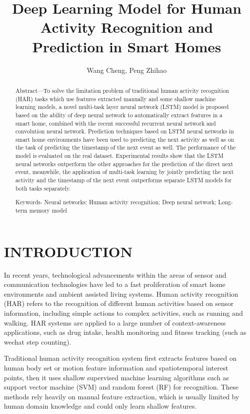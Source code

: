 \documentclass{article}
\title{Deep Learning Model for Human Activity Recognition and Prediction in Smart Homes}
\author{Wang Cheng, Peng Zhihao}
\affil{School of Digital Arts and Design, Dalian Neusoft University of Information, Dalian 116626, China wangcheng@neusoft.edu.cn}
\begin{document}
\maketitle
\begin{abstract}
    Abstract—To solve the limitation problem of traditional human activity recognition (HAR) tasks which use features extracted manually and some shallow machine learning models, a novel multi-task layer neural network (LSTM) model is proposed based on the ability of deep neural network to automatically extract features in a smart home, combined with the recent successful recurrent neural network and convolution neural network. Prediction techniques based on LSTM neural networks in smart home environments have been used to predicting the next activity as well as on the task of predicting the timestamp of the next event as well. The performance of the model is evaluated on the real dataset. Experimental results show that the LSTM neural networks outperform the other approaches for the prediction of the direct next event, meanwhile, the application of multi-task learning by jointly predicting the next activity and the timestamp of the next event outperforms separate LSTM models for both tasks separately.
    
    Keywords- Neural networks; Human activity recognition; Deep neural network; Long-term memory model
\end{abstract}

\section{INTRODUCTION}
In recent years, technological advancements within the areas of sensor and communication technologies have led to a fast proliferation of smart home environments and ambient assisted living systems. Human activity recognition (HAR) refers to the recognition of different human activities based on sensor information, including simple actions to complex activities, such as running and walking. HAR systems are applied to a large number of context-awareness applications, such as drug intake, health monitoring and fitness tracking (such as wechat step counting).

Traditional human activity recognition system first extracts features based on human body set or motion feature information and spatiotemporal interest points, then it uses shallow supervised machine learning algorithms such as support vector machine (SVM) and random forest (RF) for recognition. These methods rely heavily on manual feature extraction, which is usually limited by human domain knowledge and could only learn shallow features.
\end{document}
